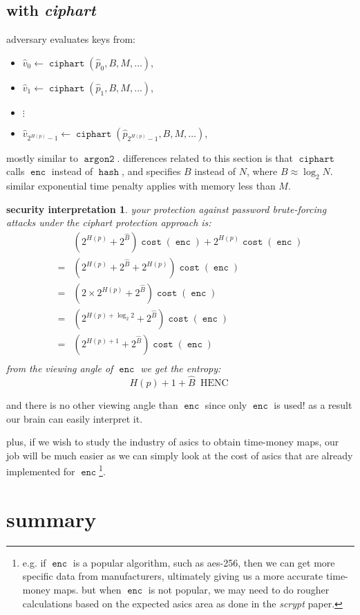 \documentclass[twocolumn]{article}
\newtheorem{security}{security interpretation}
\DeclareMathOperator{\enc}{\mathtt{enc}}
\DeclareMathOperator{\hash}{\mathtt{hash}}
\DeclareMathOperator{\argon}{\mathtt{argon2}}
\DeclareMathOperator{\ciphart}{\mathtt{ciphart}}
\DeclareMathOperator{\cost}{\mathtt{cost}}
\DeclareMathOperator{\henc}{\; HENC}
\begin{document}
\subsection{with \emph{ciphart}}
adversary evaluates keys from:
\begin{itemize}
    \item $\hat v_0 \gets \ciphart(\hat p_0, B, M, \ldots)$,
    \item $\hat v_1 \gets \ciphart(\hat p_1, B, M, \ldots)$,
    \item $\vdots$
    \item $\hat v_{2^{H(p)}-1} \gets \ciphart(\hat p_{2^{H(p)}-1}, B, M,
    \ldots)$,
\end{itemize}

mostly similar to $\argon$.  differences related to this section is that
$\ciphart$ calls $\enc$ instead of $\hash$, and specifies $B$ instead of
$N$, where $B \approx \log_2 N$.  similar exponential time penalty applies
with memory less than $M$.

\begin{security}
your protection against password brute-forcing attacks under the
\emph{ciphart} protection approach is:
\begin{align*}
        & \left(2^{H(p)} + 2^{\hat B}\right) \cost(\enc) + 2^{H(p)}
            \cost(\enc) \\
    ={} & \left(2^{H(p)} + 2^{\hat B} + 2^{H(p)}\right) \cost(\enc) \\
    ={} & \left(2\times2^{H(p)} + 2^{\hat B}\right) \cost(\enc) \\
    ={} & \left(2^{H(p) + \log_2 2} + 2^{\hat B}\right) \cost(\enc) \\
    ={} & \left(2^{H(p) + 1} + 2^{\hat B}\right) \cost(\enc) \\
\end{align*}
from the viewing angle of $\enc$ we get the entropy:
\[
    H(p) + 1 + \hat B \henc
\]
\end{security}

and there is no other viewing angle than $\enc$ since only $\enc$ is used!
as a result our brain can easily interpret it.  

plus, if we wish to study the industry of asics to obtain time-money maps,
our job will be much easier as we can simply look at the cost of asics that
are already implemented for $\enc$\footnote{e.g. if $\enc$ is a popular
algorithm, such as aes-256, then we can get more specific data from
manufacturers, ultimately giving us a more accurate time-money maps.  but
when $\enc$ is not popular, we may need to do rougher calculations based on
the expected asics area as done in the \emph{scrypt} paper.}.

\section{summary}
\end{document}
